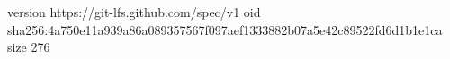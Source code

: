 version https://git-lfs.github.com/spec/v1
oid sha256:4a750e11a939a86a089357567f097aef1333882b07a5e42c89522fd6d1b1e1ca
size 276
